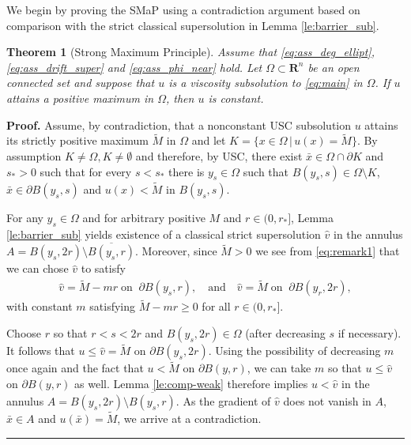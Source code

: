 \documentclass[12pt]{article}
\newtheorem{theorem}{Theorem}
\newenvironment{proof}[1][Proof]{\textbf{#1.} }{\ \rule{0.5em}{0.5em}}
\numberwithin{komcounter}{section}
\begin{document}
We begin by proving the SMaP using a contradiction argument based on comparison with the strict classical supersolution in Lemma \ref{le:barrier_sub}.

\begin{theorem}[Strong Maximum Principle]\label{thm:SMP}
Assume that \eqref{eq:ass_deg_ellipt}, \eqref{eq:ass_drift_super} and \eqref{eq:ass_phi_near} hold.
Let $\Omega \subset \mathbf{R}^n$ be an open connected set and suppose that $u$
is a viscosity subsolution to \eqref{eq:main} in $\Omega$.
If $u$ attains a positive maximum in $\Omega$, then $u$ is constant.
\end{theorem}







\noindent
\begin{proof}
Assume, by contradiction, that a nonconstant USC subsolution $u$ attains its strictly positive maximum $\tilde M$ in $\Omega$ and let $K = \{x \in \Omega \,|\, u(x) = \tilde M\}$.
By assumption $K \neq \Omega, K\neq \emptyset$ and therefore, by USC, there exist $\bar{x} \in \Omega \cap \partial K$ and $s_\ast > 0$ such that for every $s <s_\ast$ there is $y_s \in \Omega$ such that
$B(y_s,s) \in \Omega \setminus K$, $\bar{x} \in \partial B(y_s,s)$ and $u(x) < \tilde M$ in $B(y_s,s)$.

For any $y_s \in \Omega$ and for arbitrary positive $M$ and $r \in (0, r_*]$, Lemma \ref{le:barrier_sub} yields existence of a classical strict supersolution $\hat{v}$ in the annulus $A = B(y_s,2r)\setminus \overline{B(y_s,r)}$. %
Moreover, since $\tilde{M} > 0$ we see from \eqref{eq:remark1} that we can chose $\hat v$ to satisfy
%
\begin{align*}
\hat{v} = \tilde M - mr   \;\text{on}\;\; \partial B(y_s, r), \quad \mbox{and} \quad  \hat{v} = \tilde M \;\text{on}\;\;\partial B(y_r, 2r),
\end{align*}
%
with constant $m$ satisfying $\tilde M - mr \geq 0$ for all $r \in (0,r_\ast]$.

Choose $r$ so that $r < s < 2r$ and $B(y_s,2r) \in \Omega$ (after decreasing $s$ if necessary).
It follows that $u \leq \hat{v} =  \tilde M$ on $\partial B(y_s,2r)$.
Using the possibility of decreasing $m$ once again and the fact that $u < \tilde{M}$ on $\partial B(y,r)$,
we can take $m$ so that $u \leq \hat{v}$ on $\partial B(y,r)$ as well.
Lemma \ref{le:comp-weak} therefore implies $u < \hat{v}$ in the annulus $A = B(y_s,2r)\setminus \overline{B(y_s,r)}$.
As the gradient of $\hat{v}$ does not vanish in $A$, $\bar{x} \in A$ and $u(\bar{x}) = \tilde{M}$, we arrive at a contradiction.
\end{proof}\\
\end{document}
